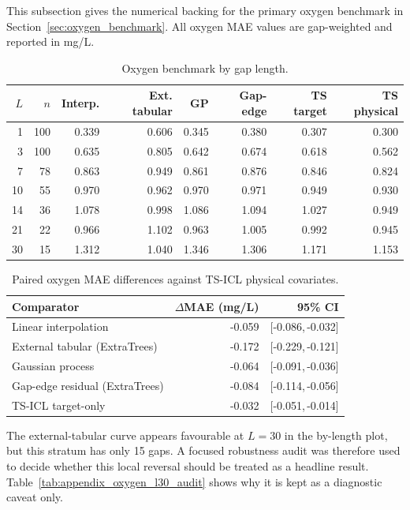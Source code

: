 This subsection gives the numerical backing for the primary oxygen benchmark in
Section~\ref{sec:oxygen_benchmark}. All oxygen MAE values are gap-weighted and reported in mg/L.

\begin{table}[H]
  \centering
  \small
  \caption{Oxygen benchmark by gap length.}
  \label{tab:appendix_oxygen_by_length}
  \begin{tabular}{r r r r r r r r}
    \toprule
    $L$ & $n$ & Interp. & Ext. tabular & GP & Gap-edge & TS target & TS physical \\
    \midrule
    1  & 100 & 0.339 & 0.606 & 0.345 & 0.380 & 0.307 & 0.300 \\
    3  & 100 & 0.635 & 0.805 & 0.642 & 0.674 & 0.618 & 0.562 \\
    7  & 78  & 0.863 & 0.949 & 0.861 & 0.876 & 0.846 & 0.824 \\
    10 & 55  & 0.970 & 0.962 & 0.970 & 0.971 & 0.949 & 0.930 \\
    14 & 36  & 1.078 & 0.998 & 1.086 & 1.094 & 1.027 & 0.949 \\
    21 & 22  & 0.966 & 1.102 & 0.963 & 1.005 & 0.992 & 0.945 \\
    30 & 15  & 1.312 & 1.040 & 1.346 & 1.306 & 1.171 & 1.153 \\
    \bottomrule
  \end{tabular}
\end{table}

\begin{table}[h]
  \centering
  \small
  \caption{Paired oxygen MAE differences against TS-ICL physical covariates.}
  \label{tab:appendix_oxygen_paired_deltas}
  \begin{tabular}{l r r}
    \toprule
    Comparator & $\Delta$MAE (mg/L) & 95\% CI \\
    \midrule
    Linear interpolation & -0.059 & [-0.086,\,-0.032] \\
    External tabular (ExtraTrees) & -0.172 & [-0.229,\,-0.121] \\
    Gaussian process & -0.064 & [-0.091,\,-0.036] \\
    Gap-edge residual (ExtraTrees) & -0.084 & [-0.114,\,-0.056] \\
    TS-ICL target-only & -0.032 & [-0.051,\,-0.014] \\
    \bottomrule
  \end{tabular}
\end{table}

The external-tabular curve appears favourable at $L=30$ in the by-length plot, but this stratum has
only 15 gaps. A focused robustness audit was therefore used to decide whether this local reversal
should be treated as a headline result. Table~\ref{tab:appendix_oxygen_l30_audit} shows why it is
kept as a diagnostic caveat only.

